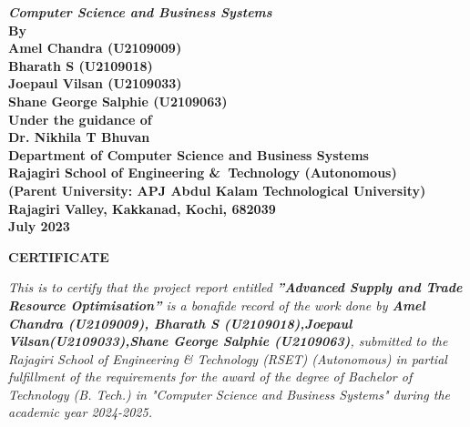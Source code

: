 \begin{center}
	{\Large \bf \itshape{{Computer Science and Business Systems}}}\\[1cm]
	\large \bfseries{By}\\[.2cm]
	\large \bfseries{Amel Chandra (U2109009)}\\[0.3cm]
	\large \bfseries{Bharath S (U2109018)}\\[0.3cm]
	\large \bfseries{Joepaul Vilsan (U2109033)}\\[0.3cm]
	\large \bfseries{Shane George Salphie (U2109063)}\\[0.3cm]
	\large \bfseries{Under the guidance of}\\[0.5cm]
	\large \bfseries{Dr. Nikhila T Bhuvan}\\[0.3cm]
	\large \textbf{Department of Computer Science and Business Systems}\\
	\large \textbf{Rajagiri School of Engineering \&\ Technology (Autonomous)}\\
	\small \bfseries{(Parent University: APJ Abdul Kalam Technological University)}\\
	\large \textbf{Rajagiri Valley, Kakkanad, Kochi, 682039}\\
	\large \bfseries{July 2023}
\end{center}

\newpage
\thispagestyle{empty}
\vspace{1cm}
\begin{center}

	\large \bfseries{\huge{CERTIFICATE}}\\[1cm]
\end{center}

\renewcommand{\baselinestretch}{1.2}\normalsize

\emph{This is to certify that the project report entitled \textbf{”Advanced Supply and Trade Resource Optimisation”} is a bonafide record of the work done by \textbf{Amel Chandra (U2109009), Bharath S (U2109018),Joepaul Vilsan(U2109033),Shane George Salphie (U2109063)}, submitted to the Rajagiri School of Engineering \& Technology (RSET) (Autonomous) in
	partial fulfillment of the requirements for the award of the degree of Bachelor of Technology (B. Tech.) in "Computer Science and Business Systems" during the academic year 2024-2025.}\\[2.5cm]

